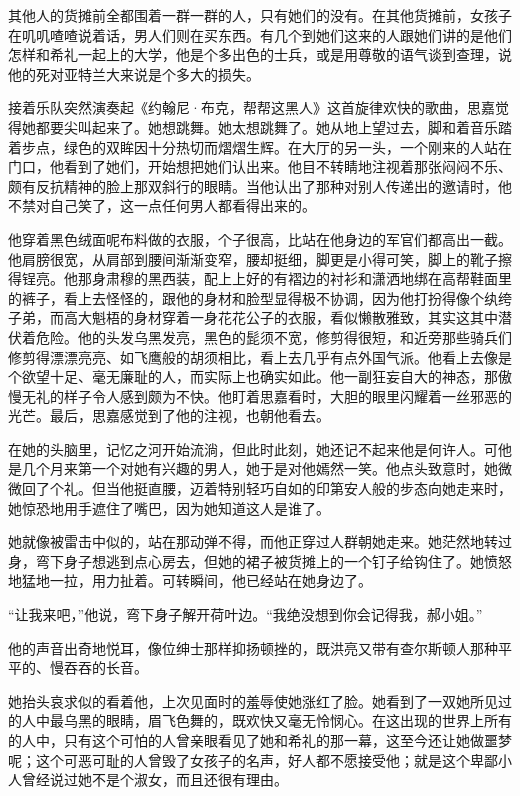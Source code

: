 \par 其他人的货摊前全都围着一群一群的人，只有她们的没有。在其他货摊前，女孩子在叽叽喳喳说着话，男人们则在买东西。有几个到她们这来的人跟她们讲的是他们怎样和希礼一起上的大学，他是个多出色的士兵，或是用尊敬的语气谈到查理，说他的死对亚特兰大来说是个多大的损失。
\par 接着乐队突然演奏起《约翰尼·布克，帮帮这黑人》这首旋律欢快的歌曲，思嘉觉得她都要尖叫起来了。她想跳舞。她太想跳舞了。她从地上望过去，脚和着音乐踏着步点，绿色的双眸因十分热切而熠熠生辉。在大厅的另一头，一个刚来的人站在门口，他看到了她们，开始想把她们认出来。他目不转睛地注视着那张闷闷不乐、颇有反抗精神的脸上那双斜行的眼睛。当他认出了那种对别人传递出的邀请时，他不禁对自己笑了，这一点任何男人都看得出来的。
\par 他穿着黑色绒面呢布料做的衣服，个子很高，比站在他身边的军官们都高出一截。他肩膀很宽，从肩部到腰间渐渐变窄，腰却挺细，脚更是小得可笑，脚上的靴子擦得锃亮。他那身肃穆的黑西装，配上上好的有褶边的衬衫和潇洒地绑在高帮鞋面里的裤子，看上去怪怪的，跟他的身材和脸型显得极不协调，因为他打扮得像个纨绔子弟，而高大魁梧的身材穿着一身花花公子的衣服，看似懒散雅致，其实这其中潜伏着危险。他的头发乌黑发亮，黑色的髭须不宽，修剪得很短，和近旁那些骑兵们修剪得漂漂亮亮、如飞鹰般的胡须相比，看上去几乎有点外国气派。他看上去像是个欲望十足、毫无廉耻的人，而实际上也确实如此。他一副狂妄自大的神态，那傲慢无礼的样子令人感到颇为不快。他盯着思嘉看时，大胆的眼里闪耀着一丝邪恶的光芒。最后，思嘉感觉到了他的注视，也朝他看去。
\par 在她的头脑里，记忆之河开始流淌，但此时此刻，她还记不起来他是何许人。可他是几个月来第一个对她有兴趣的男人，她于是对他嫣然一笑。他点头致意时，她微微回了个礼。但当他挺直腰，迈着特别轻巧自如的印第安人般的步态向她走来时，她惊恐地用手遮住了嘴巴，因为她知道这人是谁了。
\par 她就像被雷击中似的，站在那动弹不得，而他正穿过人群朝她走来。她茫然地转过身，弯下身子想逃到点心房去，但她的裙子被货摊上的一个钉子给钩住了。她愤怒地猛地一拉，用力扯着。可转瞬间，他已经站在她身边了。
\par “让我来吧，”他说，弯下身子解开荷叶边。“我绝没想到你会记得我，郝小姐。”
\par 他的声音出奇地悦耳，像位绅士那样抑扬顿挫的，既洪亮又带有查尔斯顿人那种平平的、慢吞吞的长音。
\par 她抬头哀求似的看着他，上次见面时的羞辱使她涨红了脸。她看到了一双她所见过的人中最乌黑的眼睛，眉飞色舞的，既欢快又毫无怜悯心。在这出现的世界上所有的人中，只有这个可怕的人曾亲眼看见了她和希礼的那一幕，这至今还让她做噩梦呢；这个可恶可耻的人曾毁了女孩子的名声，好人都不愿接受他；就是这个卑鄙小人曾经说过她不是个淑女，而且还很有理由。

